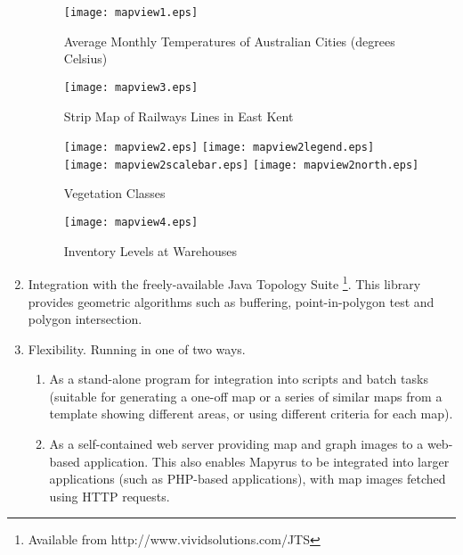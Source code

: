 \begin{enumerate}
\begin{figure}
\texttt{[image: mapview1.eps]}
\caption[Average Monthly Temperatures]{Average Monthly Temperatures of Australian Cities (degrees Celsius)}
\label{mapview1}
\end{figure}

\begin{figure}
\texttt{[image: mapview3.eps]}
\caption{Strip Map of Railways Lines in East Kent}
\label{mapview3}
\end{figure}

\begin{figure}

\texttt{[image: mapview2.eps]}
\texttt{[image: mapview2legend.eps]}
\vspace{1pt}
\texttt{[image: mapview2scalebar.eps]}
\texttt{[image: mapview2north.eps]}
\caption{Vegetation Classes}
\label{mapview2}
\end{figure}

\begin{figure}
\texttt{[image: mapview4.eps]}
\caption{Inventory Levels at Warehouses}
\label{mapview4}
\end{figure}


\item
Integration with the freely-available
Java Topology Suite
\footnote{Available from http://www.vividsolutions.com/JTS}.
This library provides geometric algorithms
such as buffering, point-in-polygon test and polygon intersection.

\item
Flexibility.  Running in one of two ways.

\begin{enumerate}
\item
As a stand-alone program for integration into
scripts and batch tasks (suitable for generating a one-off
map or a series of similar maps from a template
showing different areas, or using different criteria for each map).

\item
As a self-contained web server providing map and
graph images to a web-based application.
This also enables Mapyrus to be integrated into larger applications
(such as PHP-based applications),
with map images fetched using HTTP requests.

\end{enumerate}

\end{enumerate}

